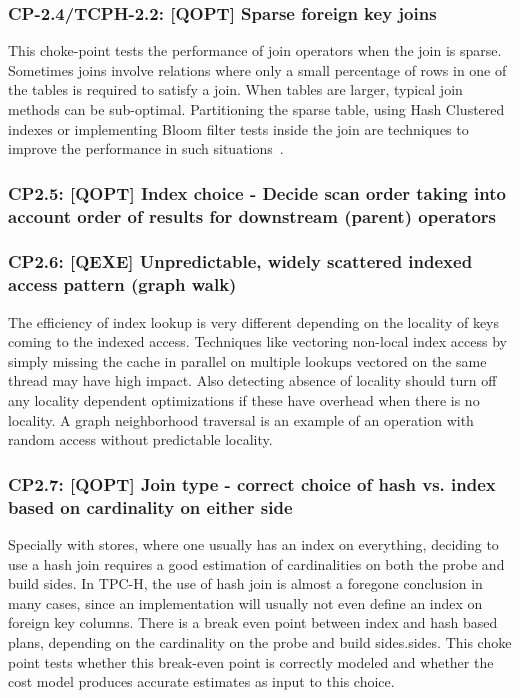 \subsubsection{CP-2.4/TCPH-2.2: [QOPT]  Sparse foreign key joins}
\label{choke_point_2.4}
This choke-point tests the performance of join operators when the join is sparse. Sometimes joins involve relations where only a small percentage of rows in one of the tables is required to satisfy a join. When tables are larger, typical join methods can be sub-optimal. Partitioning the sparse table, using Hash Clustered indexes or implementing Bloom filter tests inside the join are techniques to improve the performance in such situations~\cite{DBLP:journals/csur/Graefe93}.

\subsubsection{CP2.5: [QOPT] Index choice - Decide scan order taking into account order of results for downstream (parent) operators}
\label{choke_point_2.5}

\subsubsection{CP2.6: [QEXE] Unpredictable, widely scattered indexed access pattern (graph walk)}
\label{choke_point_2.6}
The efficiency of index lookup is very different depending on the locality of keys coming to the indexed access. Techniques like vectoring non-local index access by simply missing the cache in parallel on multiple lookups vectored on the same thread may have high impact. Also detecting absence of locality should turn off any locality dependent optimizations if these have overhead when there is no locality. A graph neighborhood traversal is an example of an operation with random access without predictable locality.

\subsubsection{CP2.7: [QOPT] Join type - correct choice of hash vs. index based on cardinality on either side}
\label{choke_point_2.7}
Specially with stores, where one usually has an index on everything, deciding to use a hash join requires a good estimation of cardinalities on both the probe and build sides. In TPC-H, the use of hash join is almost a foregone conclusion in many cases, since an implementation will usually not even define an index on foreign key columns. There is a break even point between index and hash based plans, depending on the cardinality on the probe and build sides.sides. This choke point tests whether this break-even point is correctly modeled and whether the cost model produces accurate estimates as input to this choice.


